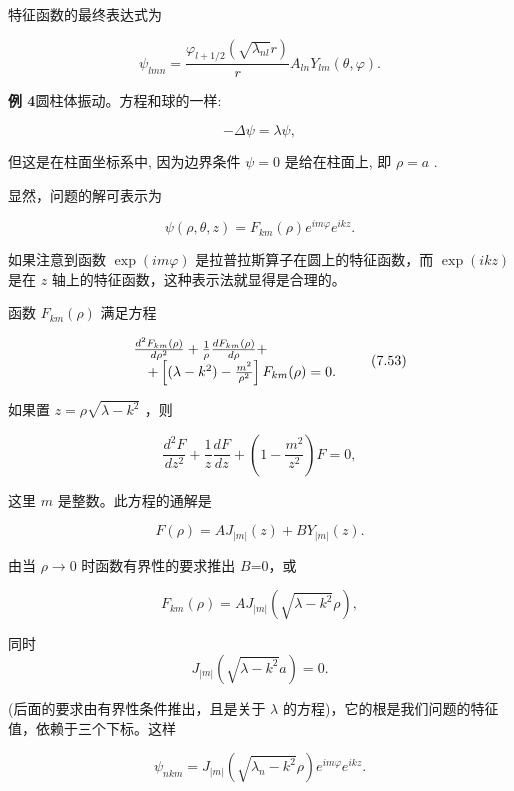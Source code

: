 特征函数的最终表达式为

\begin{equation*}
\psi_ {l m n} = \frac {\varphi_ {l + 1 / 2} (\sqrt {\lambda_ {n l}} r)}{r} A _ {l n} Y _ {l m} (\theta , \varphi).\tag{7.51}
\end{equation*}

\textbf{例 4}\quad 圆柱体振动。方程和球的一样:

\begin{equation*}
- \Delta \psi = \lambda \psi ,\tag{7.52}
\end{equation*}

但这是在柱面坐标系中, 因为边界条件 $\psi = 0$ 是给在柱面上, 即 $\rho = a$ .

显然，问题的解可表示为

\begin{equation*}
\psi (\rho , \theta , z) = F _ {k m} (\rho) e ^ {i m \varphi} e ^ {i k z}.
\end{equation*}

如果注意到函数 $\exp (im\varphi)$ 是拉普拉斯算子在圆上的特征函数，而 $\exp (ikz)$ 是在 $z$ 轴上的特征函数，这种表示法就显得是合理的。

函数 $F_{km}(\rho)$ 满足方程

\begin{equation*}
\begin{array}{r l} & \frac {d ^ {2} F _ {k m} (\rho)}{d \rho^ {2}} + \frac {1}{\rho} \frac {d F _ {k m} (\rho)}{d \rho} + \\ & \quad + \left[ (\lambda - k ^ {2}) - \frac {m ^ {2}}{\rho^ {2}} \right] F _ {k m} (\rho) = 0. \end{array}\tag{7.53}
\end{equation*}

如果置 $z = \rho \sqrt{\lambda - k^2}$ ，则

\begin{equation*}
\frac {d ^ {2} F}{d z ^ {2}} + \frac {1}{z} \frac {d F}{d z} + \left(1 - \frac {m ^ {2}}{z ^ {2}}\right) F = 0,\tag{7.54}
\end{equation*}

这里 $m$ 是整数。此方程的通解是

\begin{equation*}
F (\rho) = A J _ {| m |} (z) + B Y _ {| m |} (z).\tag{7.55}
\end{equation*}

由当 $\rho\rightarrow0$ 时函数有界性的要求推出 $B$=0，或

\begin{equation*}
F _ {k m} (\rho) = A J _ {| m |} \left(\sqrt {\lambda - k ^ {2}} \rho\right),
\end{equation*}

同时
\begin{equation*}
J _ {| m |} (\sqrt {\lambda - k ^ {2}} a) = 0.
\end{equation*}

(后面的要求由有界性条件推出，且是关于 $\lambda$ 的方程)，它的根是我们问题的特征值，依赖于三个下标。这样

\begin{equation*}
\psi_ {n k m} = J _ {| m |} (\sqrt {\lambda_ {n} - k ^ {2}} \rho) e ^ {i m \varphi} e ^ {i k z}.\tag{7.56}
\end{equation*}
